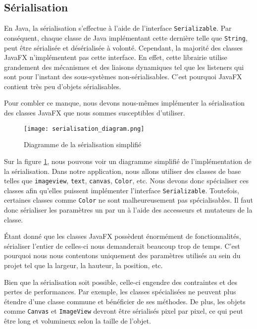 \subsection{Sérialisation}
\label{sec:serialisation}

En Java, la sérialisation s'effectue à l'aide de l'interface \texttt{Serializable}. Par conséquent, chaque classe de Java implémentant cette dernière telle que \texttt{String}, peut être sérialisée et désérialisée à volonté. Cependant, la majorité des classes JavaFX n'implémentent pas cette interface. En effet, cette librairie utilise grandement des mécanismes et des liaisons dynamiques tel que les listeners qui sont pour l'instant des sous-systèmes non-sérialisables. C'est pourquoi JavaFX contient très peu d'objets sérialisables.

Pour combler ce manque, nous devons nous-mêmes implémenter la sérialisation des classes JavaFX que nous sommes susceptibles d'utiliser.

\begin{figure}[!ht]
    \caption{Diagramme de la sérialisation simplifié}
    \centering
    \texttt{[image: serialisation\_diagram.png]}
    \label{fig:seri_diag}
\end{figure}

Sur la figure \ref{fig:seri_diag}, nous pouvons voir un diagramme simplifié de l'implémentation de la sérialisation. Dans notre application, nous allons utiliser des classes de base telles que \texttt{\gls{imageview}}, \texttt{\gls{text}}, \texttt{\gls{canvas}}, \texttt{Color}, etc. Nous devons donc spécialiser ces classes afin qu'elles puissent implémenter l'interface \texttt{Serializable}. Toutefois, certaines classes comme \texttt{Color} ne sont malheureusement pas spécialisables. Il faut donc sérialiser les paramètres un par un à l'aide des accesseurs et mutateurs de la classe.

Étant donné que les classes JavaFX possèdent énormément de fonctionnalités, sérialiser l'entier de celles-ci nous demanderait beaucoup trop de temps. C'est pourquoi nous nous contentons uniquement des paramètres utilisés au sein du projet tel que la largeur, la hauteur, la position, etc.

\newpage


Bien que la sérialisation soit possible, celle-ci engendre des contraintes et des pertes de performances. Par exemple, les classes spécialisées ne peuvent plus étendre d'une classe commune et bénéficier de ses méthodes. De plus, les objets comme \texttt{Canvas} et \texttt{ImageView} devront être sérialisés pixel par pixel, ce qui peut être long et volumineux selon la taille de l'objet.

